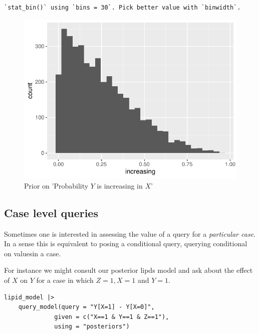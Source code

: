 \documentclass[
  article]{jss}
\begin{document}
\begin{verbatim}
`stat_bin()` using `bins = 30`. Pick better value with `binwidth`.
\end{verbatim}

\begin{figure}[H]

{\centering \includegraphics{paper_files/figure-pdf/unnamed-chunk-94-1.pdf}

}

\caption{Prior on 'Probability \(Y\) is increasing in \(X\)'}

\end{figure}

\hypertarget{case-level-queries}{%
\subsection{Case level queries}\label{case-level-queries}}

Sometimes one is interested in assessing the value of a query for a
\emph{particular case}. In a sense this is equivalent to posing a
conditional query, querying conditional on valuesin a case.

For instance we might consult our posterior lipds model and ask about
the effect of \(X\) on \(Y\) for a case in which \(Z=1, X=1\) and
\(Y=1\).

\begin{verbatim}
lipid_model |>
    query_model(query = "Y[X=1] - Y[X=0]",
              given = c("X==1 & Y==1 & Z==1"),
              using = "posteriors")
\end{verbatim}
\end{document}
